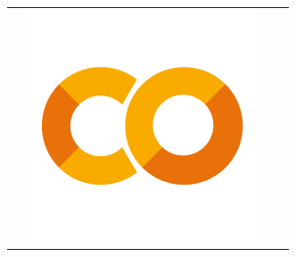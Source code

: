 \begin{frame}
\begin{table}[htp]
\begin{tabular}{cccc}
\begin{minipage}{.2\textwidth}
        \end{minipage} 
                                                        & 
        \begin{minipage}{.2\textwidth}
          \includegraphics[width=.9\textwidth]{imagenes/chapter3/Colab}
        \end{minipage} 
                                                        &
                                                        \\
      \end{tabular}
  \end{table}
\end{frame}
